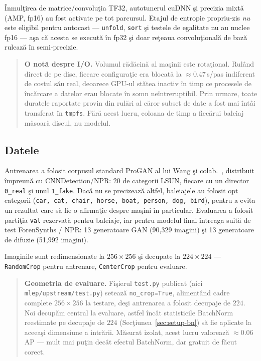 Înmulţirea de matrice/convoluţia TF32, autotunerul cuDNN şi precizia mixtă (AMP,
fp16) au fost activate pe tot parcursul. Etajul de entropie propriu-zis
\emph{nu} este eligibil pentru autocast --- \texttt{unfold}, \texttt{sort} şi
testele de egalitate nu au nuclee fp16 --- aşa că acesta se execută în fp32 şi
doar reţeaua convoluţională de bază rulează în semi-precizie.

\begin{quote}\small
\textbf{O notă despre I/O.} Volumul rădăcină al maşinii este rotaţional. Rulând
direct de pe disc, fiecare configuraţie era blocată la $\approx0.47$\,s/pas
indiferent de costul său real, deoarece GPU-ul stătea inactiv în timp ce
procesele de încărcare a datelor erau blocate în somn neîntreruptibil. Prin
urmare, toate duratele raportate provin din rulări al căror subset de date a
fost mai întâi transferat în \texttt{tmpfs}. Fără acest lucru, coloana de timp a
fiecărui baleiaj măsoară discul, nu modelul.
\end{quote}

\subsection{Datele}

Antrenarea a folosit corpusul standard ProGAN al lui Wang şi
colab.~\cite{wang2020cnn}, distribuit împreună cu CNNDetection/NPR: 20 de
categorii LSUN, fiecare cu un director \texttt{0\_real} şi unul
\texttt{1\_fake}. Dacă nu se precizează altfel, baleiajele au folosit opt
categorii (\texttt{car, cat, chair, horse, boat, person, dog, bird}), pentru a
evita un rezultat care să fie o afirmaţie despre maşini în particular. Evaluarea
a folosit partiţia \texttt{val} rezervată pentru baleiaje, iar pentru modelul
final întreaga suită de test ForenSynths / NPR: 13 generatoare GAN
(90{,}329 imagini) şi 13 generatoare de difuzie (51{,}992 imagini).

Imaginile sunt redimensionate la $256\times256$ şi decupate la $224\times224$ ---
\texttt{RandomCrop} pentru antrenare, \texttt{CenterCrop} pentru evaluare.

\begin{quote}\small
\textbf{Geometria de evaluare.} Fişierul \texttt{test.py} publicat (aici \texttt{mlep/upstream/test.py}) setează
\texttt{no\_crop=True}, alimentând cadre complete $256\times256$ la testare, deşi
antrenarea a folosit decupaje de $224$. Noi decupăm central la evaluare, astfel
încât statisticile BatchNorm reestimate pe decupaje de $224$
(Secţiunea~\ref{sec:setup-bn}) să fie aplicate la aceeaşi dimensiune a intrării.
Măsurat izolat, acest lucru valorează $\approx0.06$ AP --- mult mai puţin decât
efectul BatchNorm, dar gratuit de făcut corect.
\end{quote}


